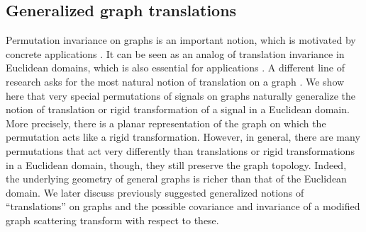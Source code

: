 \documentclass{article}
\begin{document}
\subsection{Generalized graph translations}\label{subsec:graphtranslation}

{Permutation invariance on graphs is an important notion, which is motivated by concrete applications \cite{GutVW16,DuvMI15}. It can be seen as an analog of translation invariance in Euclidean domains, which is also essential for applications \cite{Mal13, GooBC16}.} {A different line of research asks for the most natural notion of translation on a graph \cite{ShuRV16, SanM13}. We show here that very special permutations of signals on graphs naturally generalize the notion of translation or rigid transformation of a signal in a Euclidean domain. More precisely, there is a planar representation of the graph on which the permutation acts like a rigid transformation. However, in general, there are many permutations that act very differently than translations or rigid transformations in a Euclidean domain, though, they still preserve the graph topology. Indeed, the underlying geometry of general graphs is richer than that of the Euclidean domain.} 
We later discuss {previously suggested} generalized notions of ``translations'' on graphs and the possible covariance and invariance of a modified graph scattering transform with respect to these.  
\end{document}
